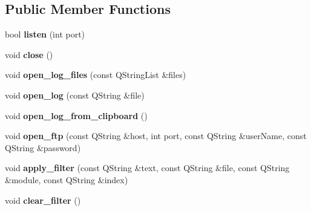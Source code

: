 \subsection*{Public Member Functions}
\begin{DoxyCompactItemize}
\item 
\hypertarget{class_log__viewer_1_1_log__manager_a6f6520f45fed69e1d5533cc712897cd5}{bool {\bfseries listen} (int port)}\label{class_log__viewer_1_1_log__manager_a6f6520f45fed69e1d5533cc712897cd5}

\item 
\hypertarget{class_log__viewer_1_1_log__manager_a52253723b1a1b37ab965d13b3348c9f1}{void {\bfseries close} ()}\label{class_log__viewer_1_1_log__manager_a52253723b1a1b37ab965d13b3348c9f1}

\item 
\hypertarget{class_log__viewer_1_1_log__manager_a4a813b21a06d0d61ecf47bf2ae0bc330}{void {\bfseries open\-\_\-log\-\_\-files} (const Q\-String\-List \&files)}\label{class_log__viewer_1_1_log__manager_a4a813b21a06d0d61ecf47bf2ae0bc330}

\item 
\hypertarget{class_log__viewer_1_1_log__manager_a6bf5991ace8b11c7d696ebc44322ddaf}{void {\bfseries open\-\_\-log} (const Q\-String \&file)}\label{class_log__viewer_1_1_log__manager_a6bf5991ace8b11c7d696ebc44322ddaf}

\item 
\hypertarget{class_log__viewer_1_1_log__manager_ae45a5b9122de8b567c25b76886727353}{void {\bfseries open\-\_\-log\-\_\-from\-\_\-clipboard} ()}\label{class_log__viewer_1_1_log__manager_ae45a5b9122de8b567c25b76886727353}

\item 
\hypertarget{class_log__viewer_1_1_log__manager_ad3101cedf680375523feebd724fb4c32}{void {\bfseries open\-\_\-ftp} (const Q\-String \&host, int port, const Q\-String \&user\-Name, const Q\-String \&password)}\label{class_log__viewer_1_1_log__manager_ad3101cedf680375523feebd724fb4c32}

\item 
\hypertarget{class_log__viewer_1_1_log__manager_a5d5f726f6a79d7ce1946af06afe2016b}{void {\bfseries apply\-\_\-filter} (const Q\-String \&text, const Q\-String \&file, const Q\-String \&module, const Q\-String \&index)}\label{class_log__viewer_1_1_log__manager_a5d5f726f6a79d7ce1946af06afe2016b}

\item 
\hypertarget{class_log__viewer_1_1_log__manager_ae495cc66ef73e09d049f14daea1c8c49}{void {\bfseries clear\-\_\-filter} ()}\label{class_log__viewer_1_1_log__manager_ae495cc66ef73e09d049f14daea1c8c49}


\end{DoxyCompactItemize}
